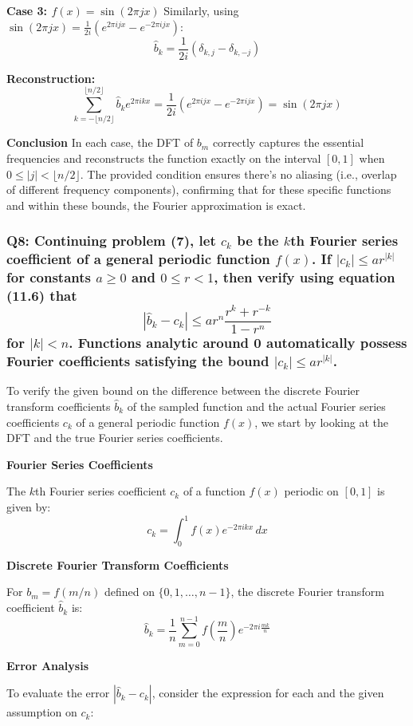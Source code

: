 \documentclass[8pt]{article}
\begin{document}
{\textbf{Case 3: \(f(x) = \sin(2\pi jx)\)}
Similarly, using \(\sin(2\pi jx) = \frac{1}{2i} (e^{2\pi ijx} - e^{-2\pi ijx})\):
\[
\hat{b}_k = \frac{1}{2i}(\delta_{k, j} - \delta_{k, -j})
\]

\textbf{Reconstruction:}
\[
\sum_{k=-\lfloor n/2 \rfloor}^{\lfloor n/2 \rfloor} \hat{b}_k e^{2\pi ikx} = \frac{1}{2i} (e^{2\pi ijx} - e^{-2\pi ijx}) = \sin(2\pi jx)
\]

\textbf{Conclusion}
In each case, the DFT of \(b_m\) correctly captures the essential frequencies and reconstructs the function exactly on the interval \([0,1]\) when \(0 \leq |j| < \lfloor n/2 \rfloor\). The provided condition ensures there's no aliasing (i.e., overlap of different frequency components), confirming that for these specific functions and within these bounds, the Fourier approximation is exact.

\subsubsection*{Q8:
Continuing problem (7), let \(c_k\) be the \(k\)th Fourier series coefficient of a general periodic function \(f(x)\). If \(|c_k| \leq ar^{|k|}\) for constants \(a \geq 0\) and \(0 \leq r < 1\), then verify using equation (11.6) that
\[
|\hat{b}_k - c_k| \leq ar^n \frac{r^k + r^{-k}}{1 - r^n}
\]
for \(|k| < n\). Functions analytic around 0 automatically possess Fourier coefficients satisfying the bound \(|c_k| \leq ar^{|k|}\).}

To verify the given bound on the difference between the discrete Fourier transform coefficients \( \hat{b}_k \) of the sampled function and the actual Fourier series coefficients \( c_k \) of a general periodic function \( f(x) \), we start by looking at the DFT and the true Fourier series coefficients. 

\textbf{Fourier Series Coefficients}

The \(k\)th Fourier series coefficient \(c_k\) of a function \(f(x)\) periodic on \([0, 1]\) is given by:
\[
c_k = \int_0^1 f(x) e^{-2\pi i k x} \, dx
\]

\textbf{Discrete Fourier Transform Coefficients}

For \(b_m = f(m/n)\) defined on \(\{0, 1, \ldots, n-1\}\), the discrete Fourier transform coefficient \( \hat{b}_k \) is:
\[
\hat{b}_k = \frac{1}{n} \sum_{m=0}^{n-1} f\left(\frac{m}{n}\right) e^{-2\pi i \frac{mk}{n}}
\]

\textbf{Error Analysis}

To evaluate the error \( |\hat{b}_k - c_k| \), consider the expression for each and the given assumption on \(c_k\):

}
\end{document}
